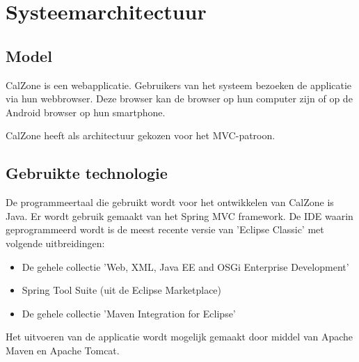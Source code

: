 \chapter{Systeemarchitectuur}
\label{chap:architectuur}

\section{Model}
\label{sec:model}
CalZone is een webapplicatie. Gebruikers van het systeem bezoeken de applicatie via hun webbrowser. Deze browser kan de browser op hun computer  zijn of op de Android browser op hun smartphone.

CalZone heeft als architectuur gekozen voor het MVC-patroon.\cite{mvc}

\section{Gebruikte technologie}
\label{sec:technologie}
De programmeertaal die gebruikt wordt voor het ontwikkelen van CalZone is Java. Er wordt gebruik gemaakt van het Spring MVC framework\cite{spring, spring-mvc}. De IDE waarin geprogrammeerd wordt is de meest recente versie van 'Eclipse Classic' met volgende uitbreidingen:

\begin{itemize}
\item De gehele collectie 'Web, XML, Java EE and OSGi Enterprise Development'	
\item Spring Tool Suite (uit de Eclipse Marketplace)
\item De gehele collectie 'Maven Integration for Eclipse'
\end{itemize}

Het uitvoeren van de applicatie wordt mogelijk gemaakt door middel van Apache Maven\cite{Maven} en Apache Tomcat\cite{Tomcat}.
